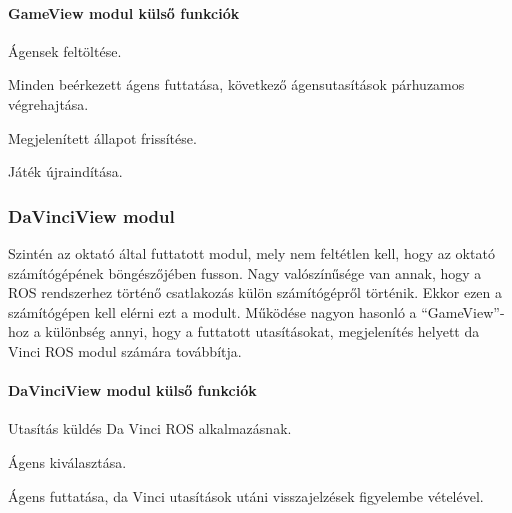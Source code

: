 \documentclass[12pt,a4paper,oneside]{report} %
\begin{document}
\paragraph{GameView modul külső funkciók}
\begin{compactitem}
	\item Ágensek feltöltése.
	\item Minden beérkezett ágens futtatása, következő ágensutasítások párhuzamos végrehajtása.
	\item Megjelenített állapot frissítése.
	\item Játék újraindítása.
\end{compactitem}

\subsubsection{DaVinciView modul}
Szintén az oktató által futtatott modul, mely nem feltétlen kell, hogy az oktató számítógépének böngészőjében fusson. Nagy valószínűsége van annak, hogy a ROS rendszerhez történő csatlakozás külön számítógépről történik. Ekkor ezen a számítógépen kell elérni ezt a modult. Működése nagyon hasonló a ``GameView''-hoz a különbség annyi, hogy a futtatott utasításokat, megjelenítés helyett da Vinci ROS modul számára továbbítja.

\paragraph{DaVinciView modul külső funkciók}
\begin{compactitem}
	\item Utasítás küldés Da Vinci ROS alkalmazásnak.
	\item Ágens kiválasztása.
	\item Ágens futtatása, da Vinci utasítások utáni visszajelzések figyelembe vételével.
\end{compactitem}
\end{document}
